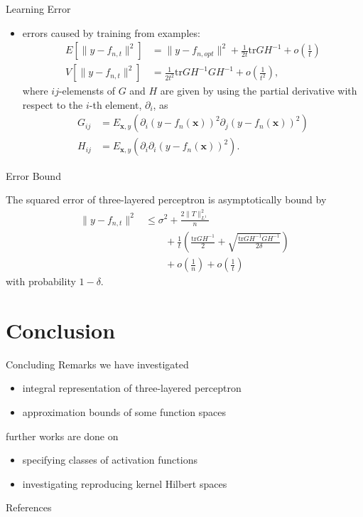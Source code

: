 \documentclass[fleqn,aspectratio=1610]{beamer}
\begin{document}
\begin{frame}[label={sec:org1bb1f72}]{Learning Error}
\begin{itemize}
\item errors caused by training from examples:
\begin{align}
  E\left[\|y-f_{n,t}\|^{2}\right]
  &=\|y-f_{n,opt}\|^{2}
    +\frac{1}{2t}\mathrm{tr} GH^{-1}+o\left(\frac{1}{t}\right)\\
  V\left[\|y-f_{n,t}\|^{2}\right]
  &=\frac{1}{2t^{2}}\mathrm{tr} GH^{-1}GH^{-1}
    +o\left(\frac{1}{t^{2}}\right),
\end{align}
where \(ij\)-elemensts of \(G\) and \(H\)
are given by using the partial derivative with respect to the
\(i\)-th element, \(\partial_{i}\), as
\begin{align}
  G_{ij}
  &=
    E_{\boldsymbol{x},y}(\partial_{i}(y-f_{n}(\boldsymbol{x}))^{2}
    \partial_{j}(y-f_{n}(\boldsymbol{x}))^{2})\\
  H_{ij}
  &=
    E_{\boldsymbol{x},y}(\partial_{i}\partial_{i}
    (y-f_{n}(\boldsymbol{x}))^{2}).
\end{align}
\end{itemize}
\end{frame}

\begin{frame}[label={sec:org9b868d5}]{Error Bound}
\begin{theorem}[]\label{sec:org735c305}
The squared error of three-layered perceptron
is asymptotically bound by
\begin{align}
  \|y-f_{n,t}\|^{2}
  &\leq \sigma^{2}+\frac{2\|T\|_{L^{1}}^2}{n}\\
  &\qquad+\frac{1}{t}\left(\frac{\mathrm{tr} GH^{-1}}{2}+
    \sqrt{\frac{\mathrm{tr} GH^{-1}GH^{-1}}{2\delta}}\right)\\
  &\qquad+o\left(\frac{1}{n}\right)+
    o\left(\frac{1}{t}\right)
\end{align}
with probability \(1-\delta\).
\end{theorem}
\end{frame}

\section{Conclusion}
\label{sec:org817db96}
\begin{frame}[label={sec:org28d5b53}]{Concluding Remarks}
we have investigated
\begin{itemize}
\item integral representation of three-layered perceptron
\item approximation bounds of some function spaces
\end{itemize}

further works are done on
\begin{itemize}
\item specifying classes of activation functions
\item investigating reproducing kernel Hilbert spaces
\end{itemize}
\end{frame}


\begin{frame}[allowframebreaks]{References}
\printbibliography[heading=none]
\end{frame}
\end{document}
